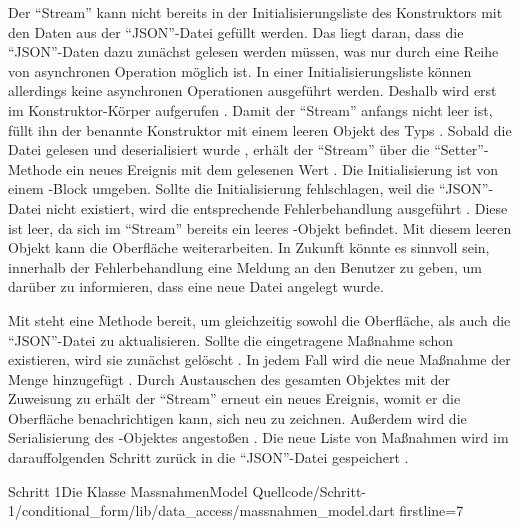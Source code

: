 Der \enquote{Stream} kann nicht bereits in der Initialisierungsliste des Konstruktors mit den Daten aus der \enquote{JSON}-Datei gefüllt werden.
Das liegt daran, dass die \enquote{JSON}-Daten dazu zunächst gelesen werden müssen, was nur durch eine Reihe von asynchronen Operation möglich ist.
In einer Initialisierungsliste können allerdings keine asynchronen Operationen ausgeführt werden.
Deshalb wird  erst im Konstruktor-Körper aufgerufen .
Damit der \enquote{Stream} anfangs nicht leer ist, füllt ihn der benannte Konstruktor  mit einem leeren Objekt des Typs  .
Sobald die Datei gelesen  und deserialisiert wurde , erhält der \enquote{Stream} über die \enquote{Setter}-Methode  ein neues Ereignis mit dem gelesenen Wert .
Die Initialisierung ist von einem -Block umgeben.
Sollte die Initialisierung fehlschlagen, weil die \enquote{JSON}-Datei nicht existiert, wird die entsprechende Fehlerbehandlung ausgeführt .
Diese ist leer, da sich im \enquote{Stream} bereits ein leeres -Objekt  befindet.
Mit diesem leeren Objekt kann die Oberfläche weiterarbeiten.
In Zukunft könnte es sinnvoll sein, innerhalb der Fehlerbehandlung eine Meldung an den Benutzer zu geben, um darüber zu informieren, dass eine neue Datei angelegt wurde.

Mit   steht eine Methode bereit, um gleichzeitig  sowohl die Oberfläche,  als auch die \enquote{JSON}-Datei zu aktualisieren.
Sollte die eingetragene Maßnahme schon existieren, wird sie zunächst gelöscht .
In jedem Fall wird die neue Maßnahme der Menge  hinzugefügt .
Durch Austauschen des gesamten Objektes mit der Zuweisung zu   erhält der \enquote{Stream} erneut ein neues Ereignis, womit er die Oberfläche benachrichtigen kann,
sich neu zu zeichnen.
Außerdem wird die Serialisierung des -Objektes angestoßen .
Die neue Liste von Maßnahmen wird im darauffolgenden Schritt zurück in die \enquote{JSON}-Datei gespeichert .

\begin{alexlisting}{Schritt 1}{Die Klasse MassnahmenModel}
  {Quellcode/Schritt-1/conditional_form/lib/data_access/massnahmen_model.dart}
  {firstline=7}
  \label{lst:Schritt1KlasseMassnahmenModel}
\end{alexlisting}
